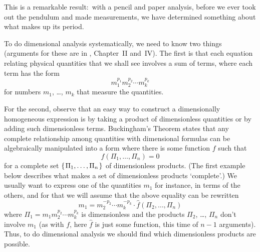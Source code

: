 This is a remarkable result:~with a pencil and paper analysis,
before we ever took out the pendulum and made measurements,
we have determined something about what makes up its period. 

To do dimensional analysis systematically, we need to know two things
(arguments for these are in \cite{Bridgman}, Chapter~II and~IV).
The first is that each equation relating physical 
quantities that we shall see involves a sum of terms, 
where each term has the form
\begin{equation*}
  m_1^{p_1}m_2^{p_2}\cdots m_k^{p_k}
\end{equation*}
for numbers $m_1$, \ldots, $m_k$ that measure the quantities.

For the second, observe that an easy way to construct a dimensionally
homogeneous expression is by taking a product of dimensionless quantities
or by adding such dimensionless terms.
Buckingham's Theorem states that any
complete relationship among quantities with 
dimensional formulas can be algebraically manipulated into a form where
there is some function $f$ such that
\begin{equation*}
  f(\Pi_1,\ldots,\Pi_n)=0
\end{equation*}
for a complete set $\mbox{$\{\hspace{0.1em}\Pi_1,\ldots,\Pi_n\hspace{0.1em}\}$}$ of dimensionless products.
(The first example below describes what makes a set of dimensionless 
products `complete'.)
We usually want to express one of the quantities 
$m_1$ for instance, in terms of the others, 
and for that we will assume that the above equality can be rewritten 
\begin{equation*}
  m_1=m_2^{-p_2}\cdots m_k^{-p_k}\cdot \hat{f}(\Pi_2,\ldots,\Pi_n)
\end{equation*}
where $\Pi_1=m_1m_2^{p_2}\cdots m_k^{p_k}$ is dimensionless
and the products $\Pi_2$, \ldots, $\Pi_n$ don't involve $m_1$
(as with $f$, here $\hat{f}$ is just some function, this time 
of $n-1$ arguments).
Thus, to do dimensional analysis we should
find which dimensionless products are possible.

